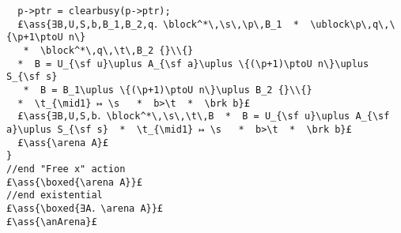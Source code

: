 \documentclass[12pt,a4paper]{article}
\makeatletter
\newcommand{\ml}[2][t]{\mbox{\mdseries\begin{tabular}[#1]{@{}L@{}}#2\end{tabular}}}
\newcommand{\ass}[1]{\ensuremath{{\color{blue}\left\{\ml[c]{#1}\right\}}}}
\makeatother
\begin{document}
\begin{lstlisting}
  p->ptr = clearbusy(p->ptr);
  £\ass{∃B,U,S,b,B_1,B_2,q．\block^*\,\s\,\p\,B_1  *  \ublock\p\,q\,\{\p+1\ptoU n\}
   *  \block^*\,q\,\t\,B_2 {}\\{}
  *  B = U_{\sf u}\uplus A_{\sf a}\uplus \{(\p+1)\ptoU n\}\uplus S_{\sf s} 
   *  B = B_1\uplus \{(\p+1)\ptoU n\}\uplus B_2 {}\\{}
  *  \t_{\mid1} ↦ \s   *  b>\t  *  \brk b}£
  £\ass{∃B,U,S,b．\block^*\,\s\,\t\,B  *  B = U_{\sf u}\uplus A_{\sf a}\uplus S_{\sf s}  *  \t_{\mid1} ↦ \s   *  b>\t  *  \brk b}£
  £\ass{\arena A}£
}
//end "Free x" action
£\ass{\boxed{\arena A}}£
//end existential
£\ass{\boxed{∃A．\arena A}}£
£\ass{\anArena}£
\end{lstlisting}\ \\
\end{document}
